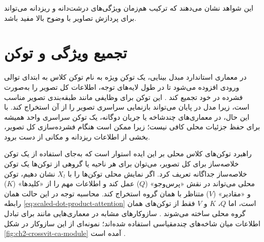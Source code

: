 \begin{table}[htbp]
    \centering
    \caption[مقایسه معماری‌های جریان دوگانه]{مقایسه معماری‌های جریان دوگانه}
    \label{tab:ch2-dual-stream-refs}
\end{table}

این شواهد نشان می‌دهند که ترکیب هم‌زمان ویژگی‌های درشت‌دانه و ریزدانه می‌تواند برای پردازش تصاویر با وضوح بالا مفید باشد.

\section{تجمیع ویژگی و توکن}
در معماری استاندارد مبدل بینایی، یک توکن ویژه به نام توکن کلاس به ابتدای توالی ورودی افزوده می‌شود تا در طول لایه‌های توجه، اطلاعات کل تصویر را به‌صورت فشرده در خود تجمیع کند \cite{Dosovitskiy2020}. این توکن برای وظایفی مانند طبقه‌بندی تصویر مناسب است، زیرا مدل در پایان می‌تواند بازنمایی سراسری تصویر را از آن استخراج کند. با این حال، در معماری‌های چندشاخه یا جریان دوگانه، یک توکن سراسری واحد همیشه برای حفظ جزئیات محلی کافی نیست؛ زیرا ممکن است هنگام فشرده‌سازی کل تصویر، بخشی از اطلاعات ریزدانه و مکانی از دست برود.

راهبرد توکن‌های کلاس محلی بر این ایده استوار است که به‌جای استفاده از یک توکن خلاصه‌ساز برای کل تصویر، می‌توان برای هر ناحیه یا گروهی از توکن‌ها یک توکن خلاصه‌ساز جداگانه تعریف کرد. اگر نمایش محلی توکن‌ها را با $X_l$ نشان دهیم، توکن محلی می‌تواند در نقش «پرس‌وجو» ($Q$) عمل کند و اطلاعات مهم را از «کلیدها» ($K$) و «مقادیر» ($V$) متناظر با همان گروه استخراج کند. محاسبه توجه در این حالت همان رابطه \ref{eq:scaled-dot-product-attention} است، اما $Q$، $K$ و $V$ فقط از توکن‌های همان گروه محلی ساخته می‌شوند \cite{Dosovitskiy2020,chen2021crossvit}.
سازوکارهای مشابه در معماری‌هایی مانند  برای تبادل اطلاعات میان شاخه‌های چندمقیاسی استفاده شده‌اند؛ نمونه‌ای از این سازوکار در شکل \ref{fig:ch2-crossvit-ca-module} آمده است \cite{chen2021crossvit}.

